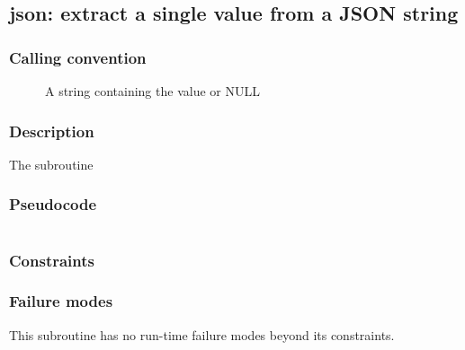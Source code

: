 \clearpage
{}
{}
\label{subr:json}
\subsection*{json: extract a single value from a JSON string}

\subsubsection*{Calling convention}

\begin{description}
\item[] A string containing the value or NULL
\end{description}

\subsubsection*{Description}

The  subroutine
\subsubsection*{Pseudocode}

\begin{verbatim}
\end{verbatim}

\subsubsection*{Constraints}

\subsubsection*{Failure modes}

This subroutine has no run-time failure modes beyond its constraints.
